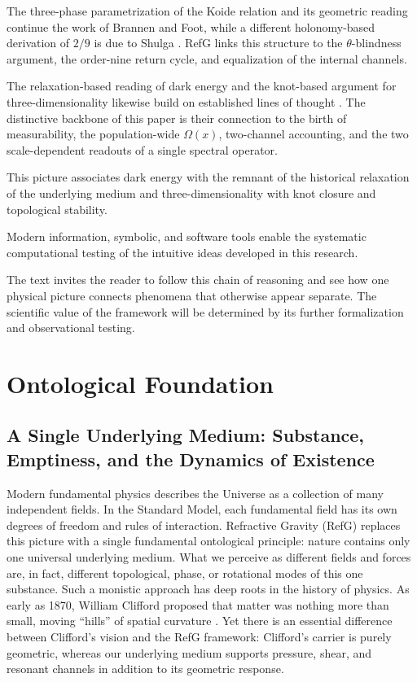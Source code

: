 \documentclass[11pt,a4paper]{article}
\begin{document}
The three-phase parametrization of the Koide relation and its geometric reading continue the work of Brannen and Foot, while a different holonomy-based derivation of $2/9$ is due to Shulga \citep{brannen2010,foot1994,shulga2026}. RefG links this structure to the $\theta$-blindness argument, the order-nine return cycle, and equalization of the internal channels.

The relaxation-based reading of dark energy and the knot-based argument for three-dimensionality likewise build on established lines of thought \citep{klinkhamer2008,whitrow1955,berera2017}. The distinctive backbone of this paper is their connection to the birth of measurability, the population-wide $\Omega(x)$, two-channel accounting, and the two scale-dependent readouts of a single spectral operator.

This picture associates dark energy with the remnant of the historical relaxation of the underlying medium and three-dimensionality with knot closure and topological stability.

Modern information, symbolic, and software tools enable the systematic computational testing of the intuitive ideas developed in this research.

The text invites the reader to follow this chain of reasoning and see how one physical picture connects phenomena that otherwise appear separate. The scientific value of the framework will be determined by its further formalization and observational testing.

\section{Ontological Foundation}

\subsection{A Single Underlying Medium: Substance, Emptiness, and the Dynamics of Existence}

Modern fundamental physics describes the Universe as a collection of many independent fields. In the Standard Model, each fundamental field has its own degrees of freedom and rules of interaction. Refractive Gravity (RefG) replaces this picture with a single fundamental ontological principle: nature contains only one universal underlying medium. What we perceive as different fields and forces are, in fact, different topological, phase, or rotational modes of this one substance. Such a monistic approach has deep roots in the history of physics. As early as 1870, William Clifford proposed that matter was nothing more than small, moving ``hills'' of spatial curvature \citep{clifford1876}. Yet there is an essential difference between Clifford's vision and the RefG framework: Clifford's carrier is purely geometric, whereas our underlying medium supports pressure, shear, and resonant channels in addition to its geometric response.
\end{document}
